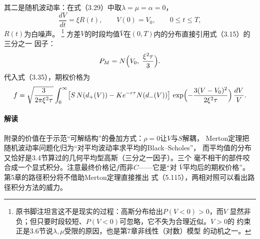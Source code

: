 其二是随机波动率：在式（3.29）中取$\lambda=\mu=\alpha=0$，
\begin{equation*}
\frac{dV}{dt}=\xi R(t),\qquad V(0)=V_{0},\qquad 0\leq t\leq T,
\end{equation*}
$R(t)$为白噪声。
\footnote{原书脚注坦言这不是现实的过程：高斯分布给出$P(V<0)>0$，而$V$
显然非负；但只要时段较短、$P(V<0)$可忽略，它不失为合理近似。$V>0$的
约束正是3.6节说$\lambda,\mu$受限的原因，也是第7章非线性（对数）模型
的动机之一。}
方差$V$的时段均值$\bar V$在$(0,T)$内的分布直接引用式（3.15）的三分之一
因子：
\begin{equation*}
P_{M}=N\Bigl(V_{0},\;\frac{\xi^{2}\tau}{3}\Bigr).
\end{equation*}
代入式（3.35），期权价格为
\begin{equation*}
f=\sqrt{\frac{3}{2\pi\xi^{2}\tau}}
\int_{0}^{\infty}\bigl[S\,N(d_{+}(V))-Ke^{-r\tau}N(d_{-}(V))\bigr]\,
\exp\Bigl(-\frac{3(V-V_{0})^{2}}{2\xi^{2}\tau}\Bigr)\,\frac{dV}{V}.
\end{equation*}

\paragraph{解读}
附录的价值在于示范“可解结构”的叠加方式：$\rho=0$让$V$与$S$解耦，
Merton定理把随机波动率问题化归为“对平均波动率求平均的Black--Scholes”，
而平均值的分布又恰好是3.4节算过的几何平均型高斯（三分之一因子）。三个
毫不相干的部件咬合成一个显式积分。注意最终价格记$f$而非$C$——它是“对
$\bar V$平均后的期权价格”。第5章的路径积分将不借助Merton定理直接推出
式（5.115），两相对照可以看出路径积分方法的威力。


